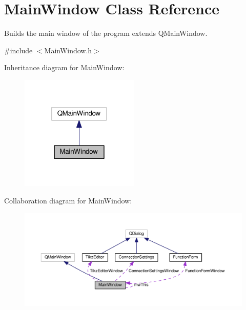 \hypertarget{classMainWindow}{\section{Main\+Window Class Reference}
\label{classMainWindow}
}


Builds the main window of the program extends Q\+Main\+Window.  




{\ttfamily \#include $<$Main\+Window.\+h$>$}



Inheritance diagram for Main\+Window\+:\nopagebreak
\begin{figure}[H]
\begin{center}
\leavevmode
\includegraphics[width=160pt]{classMainWindow__inherit__graph}
\end{center}
\end{figure}


Collaboration diagram for Main\+Window\+:\nopagebreak
\begin{figure}[H]
\begin{center}
\leavevmode
\includegraphics[width=350pt]{classMainWindow__coll__graph}
\end{center}
\end{figure}
